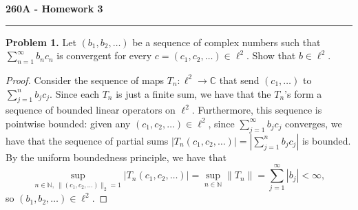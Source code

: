 \documentclass[11pt,letterpaper]{report}
\newcommand{\naturals}{\mathbb{N}}
\newcommand{\complex}{\mathbb{C}}
\begin{document}
\begin{center}
{\bf \Large 260A - Homework 3} %
\vspace{0.2cm}
\hrule
\end{center}

\noindent\textbf{Problem 1. }
Let $(b_1, b_2, \ldots)$ be a sequence of complex numbers such that $\sum_{n=1}^\infty b_nc_n$ is convergent for every $c = (c_1, c_2, \ldots)\in \ell^2$. Show that $b\in \ell^2$.
\begin{proof}
	Consider the sequence of maps $T_n: \ell^2\to \complex$ that send $(c_1, \ldots)$ to $\sum_{j=1}^n b_jc_j$. Since each $T_n$ is just a finite sum, we have that the $T_n$'s form a sequence of bounded linear operators on $\ell^2$. Furthermore, this sequence is pointwise bounded: given any $(c_1, c_2, \ldots)\in \ell^2$, since $\sum_{j=1}^\infty b_jc_j$ converges, we have that the sequence of partial sums $|T_n(c_1, c_2, \ldots)| = |\sum_{j=1}^n b_jc_j|$ is bounded. By the uniform boundedness principle, we have that
	\[
	\sup_{n\in \naturals,\ \|(c_1, c_2, \ldots)\|_2 = 1}|T_n(c_1, c_2, \ldots)| = \sup_{n\in \naturals}\|T_n\| = \sum_{j=1}^\infty |b_j|<\infty,
	\]
	so $(b_1, b_2, \ldots)\in \ell^2$.
\end{proof}
\end{document}
